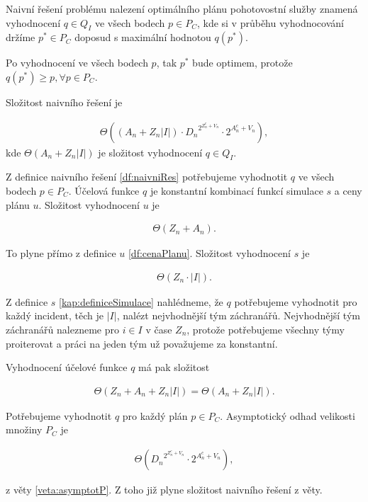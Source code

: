\begin{definice}\label{df:naivniRes}
  Naivní řešení problému nalezení optimálního plánu pohotovostní služby znamená vyhodnocení $q \in Q_I$ ve všech bodech $p \in P_C$,
  kde si v průběhu vyhodnocování držíme $p^* \in P_C$ doposud s maximální hodnotou $q(p^*)$.

  Po vyhodnocení ve všech bodech $p$, tak $p^*$ bude optimem, protože $q(p^*) \geq p, \forall p \in P_C$.
\end{definice}

\begin{veta}\label{veta:slozitostNaivRes}
  Složitost naivního řešení je

  \begin{align*}
    \Theta((A_n + Z_n |I|) \cdot {D_n}^{2^{Z^c_n + V_n}} \cdot 2^{A^c_n + V_n}),
  \end{align*}
  kde $\Theta (A_n + Z_n |I|)$ je složitost vyhodnocení $q \in Q_I$.
\end{veta}
\begin{dukaz}
  Z definice naivního řešení \ref{df:naivniRes} potřebujeme vyhodnotit $q$ ve všech bodech $p \in P_C$.
  Účelová funkce $q$ je konstantní kombinací funkcí simulace $s$ a ceny plánu $u$. Složitost vyhodnocení $u$ je

  \begin{align*}
    \Theta (Z_n + A_n).
  \end{align*}

  To plyne přímo z definice $u$ \ref{df:cenaPlanu}. Složitost vyhodnocení $s$ je

  \begin{align*}
    \Theta (Z_n \cdot |I|).
  \end{align*}

  Z definice $s$ \ref{kap:definiceSimulace} nahlédneme, že $q$ potřebujeme vyhodnotit pro každý incident, těch je $|I|$, nalézt nejvhodnější tým záchranářů.
  Nejvhodnější tým záchranářů nalezneme pro $i \in I$ v čase $Z_n$, protože potřebujeme všechny týmy proiterovat a práci na jeden tým už považujeme za konstantní. 

  Vyhodnocení účelové funkce $q$ má pak složitost

  \begin{align*}
    \Theta (Z_n + A_n + Z_n |I|) = \Theta (A_n + Z_n |I|).
  \end{align*}

  Potřebujeme vyhodnotit $q$ pro každý plán $p \in P_C$.
  Asymptotický odhad velikosti množiny $P_C$ je 

  \begin{align*}
    \Theta ({D_n}^{2^{Z^c_n + V_n}} \cdot 2^{A^c_n + V_n}),
  \end{align*}

  z věty \ref{veta:asymptotP}. Z toho již plyne složitost naivního řešení z věty.
\end{dukaz}

